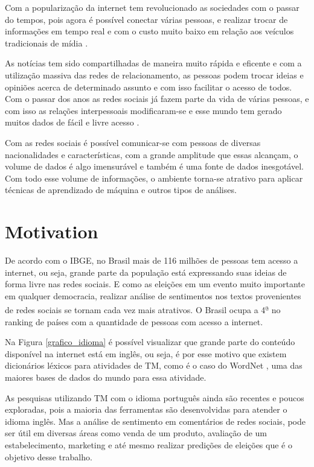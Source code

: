 Com a popularização da internet tem revolucionado as sociedades com o passar do tempos,
pois agora é possível conectar várias pessoas, e realizar trocar de informações em tempo real
e com o custo muito baixo em relação aos veículos tradicionais de mídia \cite{song2014analyzing}. 

As notícias tem sido compartilhadas de maneira muito rápida e eficente e com a utilização massiva das 
redes de relacionamento, as pessoas podem trocar ideias e opiniões acerca de determinado assunto e com isso facilitar
o acesso de todos. Com o passar dos anos as redes sociais já fazem parte da vida de várias pessoas, e com isso as relações 
interpessoais modificaram-se e esse mundo tem gerado muitos dados de fácil e livre acesso \cite{5194581}.

Com as redes sociais é possível comunicar-se com pessoas de diversas nacionalidades e características, com
a grande amplitude que essas alcançam, o volume de dados é algo imensurável e também é uma fonte de dados
inesgotável. Com todo esse volume de informações, o ambiente torna-se atrativo para aplicar técnicas de aprendizado de
máquina e outros tipos de análises.
\section{Motivation}

De acordo com o \acrshort{IBGE}, no Brasil mais de 116 milhões de pessoas tem acesso a internet, ou seja, grande parte da população está expressando suas ideias
de forma livre nas redes sociais. E como as eleições em um evento muito importante em qualquer democracia, realizar análise de sentimentos nos textos 
provenientes de redes sociais se tornam cada vez mais atrativos. O Brasil ocupa a 4\textsuperscript{\b{a}} no ranking de países com a quantidade de pessoas com acesso a internet\cite{ILS}.

Na Figura \ref{grafico_idioma} é possível visualizar que grande parte do conteúdo disponível na internet está em inglês, ou seja, é por esse motivo que
existem dicionários léxicos para atividades de \acrshort{TM}, como é o caso do WordNet \cite{miller1995wordnet}, uma das maiores bases de dados do mundo para essa atividade. 

As pesquisas utilizando \acrshort{TM} com o idioma português ainda são recentes e poucos exploradas, pois a maioria das ferramentas são desenvolvidas para atender o idioma inglês. Mas a análise
de sentimento em comentários de redes sociais, pode ser útil em diversas áreas como venda de um produto, avaliação de um estabelecimento, marketing e até mesmo realizar predições de eleições que é o objetivo desse trabalho.


